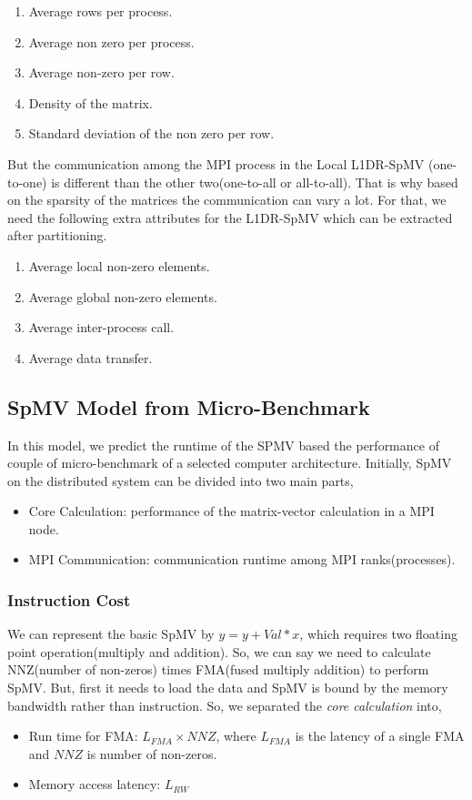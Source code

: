 \documentclass[sigconf,review,anonymous]{acmart}
\begin{document}
\begin{enumerate}
\label{list:static-attributes}
\item Average rows per process.
\item Average non zero per process.
\item Average non-zero per row.
\item Density of the matrix.
\item Standard deviation of the non zero per row.
\end{enumerate}

But the communication among the MPI process in the Local L1DR-SpMV
(one-to-one) is different than the other two(one-to-all or all-to-all).
That is why based on the sparsity of the matrices the communication
can vary a lot. For that, we need the following extra attributes for
the L1DR-SpMV which can be extracted after partitioning.

\begin{enumerate}
\item Average local non-zero elements.
\item Average global non-zero elements.
\item Average inter-process call.
\item Average data transfer.
\end{enumerate}

\subsection{SpMV Model from Micro-Benchmark}
In this model, we predict the runtime of the SPMV based the performance of couple of micro-benchmark of 
a selected computer architecture. Initially, SpMV on the distributed system can be divided into two main parts,
\begin{itemize}
\item Core Calculation: performance of the matrix-vector calculation in a MPI node.
\item MPI Communication: communication runtime among MPI ranks(processes). 
\end{itemize}
\subsubsection{Instruction Cost}
We can represent the basic SpMV by $y=y+Val*x$, which requires two floating point operation(multiply and addition). 
So, we can say we need to calculate NNZ(number of non-zeros) times FMA(fused multiply addition) to perform SpMV.
But, first it needs to load the data and SpMV is bound by the memory bandwidth rather than instruction. So, we 
separated the \textit{core calculation} into,
\begin{itemize}
\item Run time for FMA: $L_{FMA}\times NNZ$, where $L_{FMA}$ is the latency of a single FMA and $NNZ$ is number of non-zeros.
\item Memory access latency: $L_{RW}$
\end{itemize} 
\end{document}
